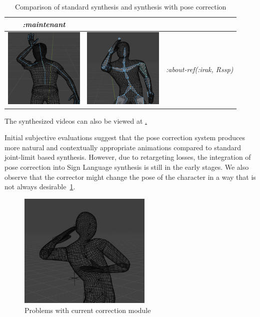 \documentclass[../../main.tex]{subfiles}
\begin{document}
\begin{table}
\begin{tabular}{|c|c|c|}
      \emph{:maintenant} \\
    \hline
    \includegraphics[width = 1.5in]{chapters/pose_correction/images/standard_synthesis_abt_ref_irak.png} & \includegraphics[width = 1.5in]{chapters/pose_correction/images/pose_correction_synthesis_abt_ref_irak.png} &
      \emph{:about-ref(:irak, Rssp)} \\
    \hline
  \end{tabular}
  \caption{Comparison of standard synthesis and synthesis with pose correction}
  \label{tab:results}
\end{table}

The synthesized videos can also be viewed at \href{todo}.

Initial subjective evaluations suggest that the pose correction system produces more natural and contextually appropriate animations compared to standard joint-limit based synthesis. However, due to retargeting losses, the integration of pose correction into Sign Language synthesis is still in the early stages. We also observe that the corrector might change the pose of the character in a way that is not always desirable~\ref{fig:problem_pose_correction}.

\begin{figure}
  \centering \includegraphics[width = 2.5in]{chapters/pose_correction/images/problem_pose_correction.png}
  \caption{Problems with current correction module}
  \label{fig:problem_pose_correction}
\end{figure}
\end{document}
